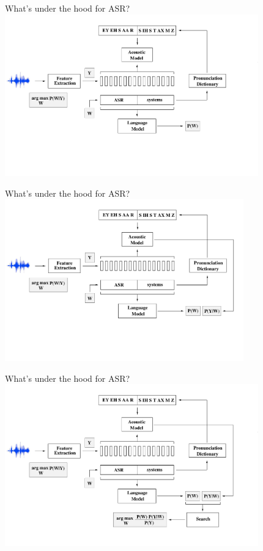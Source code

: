 \begin{frame}{What's under the hood for ASR?}
\includegraphics[height=70mm]{figures/ASR7}
\end{frame}

\begin{frame}{What's under the hood for ASR?}
\includegraphics[height=70mm]{figures/ASR8}
\end{frame}

\begin{frame}{What's under the hood for ASR?}
\includegraphics[height=70mm]{figures/ASR9}
\end{frame}


